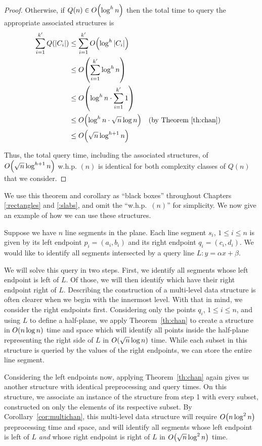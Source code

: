 \begin{proof}
\noindent Otherwise, if $Q(n) \in O\!\left(\log^h{n}\right)$ then the total time to query the appropriate associated structures is
\begin{align*}
\sum_{i=1}^{k'}{Q(|C_i|)}
&\leq \sum_{i=1}^{k'}{\BigOh{\log^h{|C_i|}}} \\
%
&\leq \BigOh{\sum_{i=1}^{k'}{\log^h{n}}} \\
%
&\leq \BigOh{\log^h{n} \cdot \sum_{i=1}^{k'}{1}} \\
%
&\leq \BigOh{\log^h{n} \cdot \sqrt{n}\log{n}} && \text{(by Theorem \ref{th:chan})}\\
%
&\leq \BigOh{\sqrt{n}\log^{h+1}{n}} \\
\end{align*}

\noindent Thus, the total query time, including the associated structures, of $O\!\left(\sqrt{n}\log^{h+1}{n}\right)$ w.h.p. $(n)$ is identical for both complexity classes of $Q(n)$ that we consider. 
\end{proof}

We use this theorem and corollary as ``black boxes'' throughout Chapters \ref{:rectangles} and \ref{:slabs}, and omit the ``w.h.p.~$(n)$'' for simplicity.
We now give an example of how we can use these structures.

Suppose we have $n$ line segments in the plane.
Each line segment $s_i$, $1 \leq i \leq n$ is given by its left endpoint $p_i = (a_i, b_i)$ and its right endpoint $q_i = (c_i, d_i)$.
We would like to identify all segments intersected by a query line $L: y = \alpha x + \beta$.

We will solve this query in two steps.
First, we identify all segments whose left endpoint is left of $L$.
Of those, we will then identify which have their right endpoint right of $L$.
Describing the construction of a multi-level data structure is often clearer when we begin with the innermost level.
With that in mind, we consider the right endpoints first. 
Considering only the points $q_i$, $1 \leq i \leq n$, and using $L$ to define a half-plane, we apply 
Theorem~\ref{th:chan} to create a structure in $O\!\left(n\log{n}\right)$ time and space which will identify all points inside the half-plane representing the right side of $L$ in $O\!\left(\sqrt{n}\log{n}\right)$ time.  
While each subset in this structure is queried by the values of the right endpoints, we can store the entire line segment.

Considering the left endpoints now, applying Theorem~\ref{th:chan} again gives us another structure with identical preprocessing and query times. 
On this structure, we associate an instance of the structure from step 1 with every subset, constructed on only the elements of its respective subset.
By Corollary~\ref{cor:multichan}, this multi-level data structure will require $O\!\left(n\log^2{n}\right)$ preprocessing time and space, and will identify all segments whose left endpoint is left of $L$ \emph{and} whose right endpoint is right of $L$ in $O\!\left(\sqrt{n}\log^2{n}\right)$ time.
